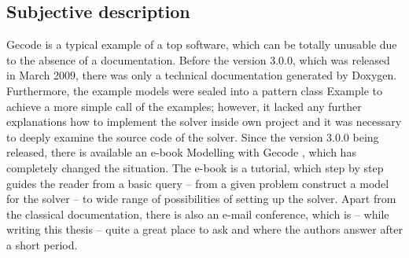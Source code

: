 \subsection{Subjective description}
Gecode is a typical example of a top software, which can be totally unusable due to
the absence of a documentation. Before the version 3.0.0, which was released in March 2009, there
was only a technical documentation generated by Doxygen. Furthermore, the example models were 
sealed into a pattern class Example to achieve a more simple call of the examples; however, it lacked any further 
explanations how to implement the solver inside own project and it was necessary to deeply
examine the source code of the solver. Since the version 3.0.0 being released, there is
available an e-book Modelling with Gecode \cite{gecode:modelling}, which has completely changed
the situation. The e-book is a tutorial, which step by step guides the reader from a basic 
query -- from a given problem construct a model for the solver -- to wide range of possibilities
of setting up the solver. Apart from the classical documentation, there is also an e-mail conference,
which is -- while writing this thesis -- quite a great place to ask and where the authors
answer after a short period.
